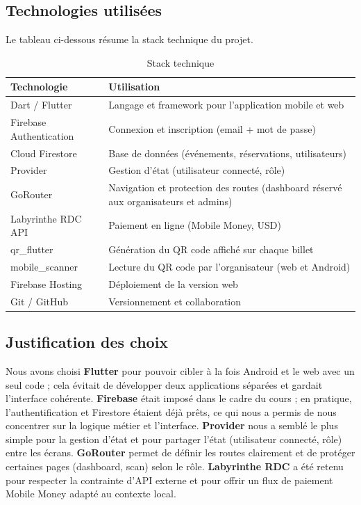 \documentclass[11pt,a4paper,oneside]{article}
\begin{document}
\subsection{Technologies utilisées}

Le tableau ci-dessous résume la stack technique du projet.

\begin{table}[H]
\centering
\caption{Stack technique}
\begin{tabularx}{\textwidth}{|l|X|}
\hline
\textbf{Technologie} & \textbf{Utilisation} \\
\hline
Dart / Flutter & Langage et framework pour l'application mobile et web \\
\hline
Firebase Authentication & Connexion et inscription (email + mot de passe) \\
\hline
Cloud Firestore & Base de données (événements, réservations, utilisateurs) \\
\hline
Provider & Gestion d'état (utilisateur connecté, rôle) \\
\hline
GoRouter & Navigation et protection des routes (dashboard réservé aux organisateurs et admins) \\
\hline
Labyrinthe RDC API & Paiement en ligne (Mobile Money, USD) \\
\hline
qr\_flutter & Génération du QR code affiché sur chaque billet \\
\hline
mobile\_scanner & Lecture du QR code par l'organisateur (web et Android) \\
\hline
Firebase Hosting & Déploiement de la version web \\
\hline
Git / GitHub & Versionnement et collaboration \\
\hline
\end{tabularx}
\end{table}

\subsection{Justification des choix}

Nous avons choisi \textbf{Flutter} pour pouvoir cibler à la fois Android et le web avec un seul code ; cela évitait de développer deux applications séparées et gardait l'interface cohérente. \textbf{Firebase} était imposé dans le cadre du cours ; en pratique, l'authentification et Firestore étaient déjà prêts, ce qui nous a permis de nous concentrer sur la logique métier et l'interface. \textbf{Provider} nous a semblé le plus simple pour la gestion d'état et pour partager l'état (utilisateur connecté, rôle) entre les écrans. \textbf{GoRouter} permet de définir les routes clairement et de protéger certaines pages (dashboard, scan) selon le rôle. \textbf{Labyrinthe RDC} a été retenu pour respecter la contrainte d'API externe et pour offrir un flux de paiement Mobile Money adapté au contexte local.
\end{document}
